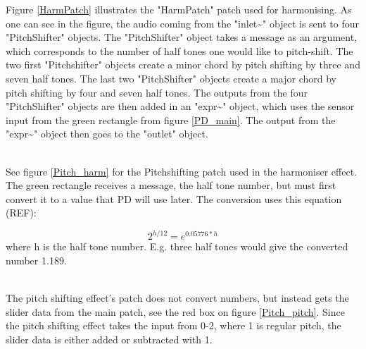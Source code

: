 Figure \ref{HarmPatch} illustrates the "HarmPatch" patch used for harmonising. As one can see in the figure, the audio coming from the "inlet\textasciitilde" object is sent to four "PitchShifter" objects. The "PitchShifter" object takes a message as an argument, which corresponds to the number of half tones one would like to pitch-shift. The two first "Pitchshifter" objects create a minor chord by pitch shifting by three and seven half tones.  The last two "PitchShifter" objects create a major chord by pitch shifting by four and seven half tones. The outputs from the four "PitchShifter" objects are then added in an "expr\textasciitilde" object, which uses the sensor input from the green rectangle from figure \ref{PD_main}. The output from the "expr\textasciitilde" object then goes to the "outlet" object.
 
\begin{minipage}{\linewidth}%
\label{HarmPatch}
\end{minipage}\\

See figure \ref{Pitch_harm} for the Pitchshifting patch used in the harmoniser effect. The green rectangle receives a message, the half tone number, but must first convert it to a value that PD will use later. The conversion uses this equation (REF):

\[ 2^{h/12} = e^{0.05776*h} \] where h is the half tone number. E.g. three half tones would give the converted number 1.189. \\

\begin{minipage}{\linewidth}%
\label{Pitch_harm}
\end{minipage}\\

The pitch shifting effect's patch does not convert numbers, but instead gets the slider data from the main patch, see the red box on figure \ref{Pitch_pitch}. Since the pitch shifting effect takes the input from 0-2, where 1 is regular pitch, the slider data is either added or subtracted with 1. 

